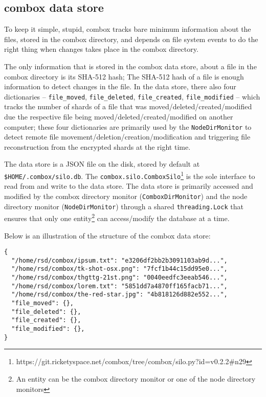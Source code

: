 \subsection{combox data store}\label{sec:3-combox-db}

To keep it simple, stupid, combox tracks bare minimum information
about the files, stored in the combox directory, and depends on file
system events to do the right thing when changes takes place in the
combox directory.

The only information that is stored in the combox data store, about a
file in the combox directory is its SHA-512 hash; The SHA-512 hash of
a file is enough information to detect changes in the file. In the
data store, there also four dictionaries -- \verb+file_moved+,
\verb+file_deleted+, \verb+file_created+, \verb+file_modified+ --
which tracks the number of shards of a file that was
moved/deleted/created/modified due the respective file being
moved/deleted/created/modified on another computer; these four
dictionaries are primarily used by the \verb+NodeDirMonitor+ to detect
remote file movement/deletion/creation/modification and triggering
file reconstruction from the encrypted shards at the right time.

The data store is a JSON file on the disk, stored by default at
\verb+$HOME/.combox/silo.db+. The
\verb+combox.silo.ComboxSilo+\footnote{https://git.ricketyspace.net/combox/tree/combox/silo.py?id=v0.2.2\#n29}
is the sole interface to read from and write to the data store. The
data store is primarily accessed and modified by the combox directory
monitor (\verb+ComboxDirMonitor+) and the node directory monitor
(\verb+NodeDirMonitor+) through a shared \verb+threading.Lock+ that ensures that only
one entity\footnote{An entity can be the combox directory monitor or
  one of the node directory monitors} can access/modify the database
at a time.

Below is an illustration of the structure of the combox data store:

\begin{verbatim}
{
  "/home/rsd/combox/ipsum.txt": "e3206df2bb2b3091103ab9d...",
  "/home/rsd/combox/tk-shot-osx.png": "7fcf1b44c15dd95e0...",
  "/home/rsd/combox/thgttg-21st.png": "0040eedfc3eeab546...",
  "/home/rsd/combox/lorem.txt": "5851dd7a4870ff165facb71...",
  "/home/rsd/combox/the-red-star.jpg": "4b818126d882e552...",
  "file_moved": {},
  "file_deleted": {},
  "file_created": {},
  "file_modified": {},
}
\end{verbatim}

